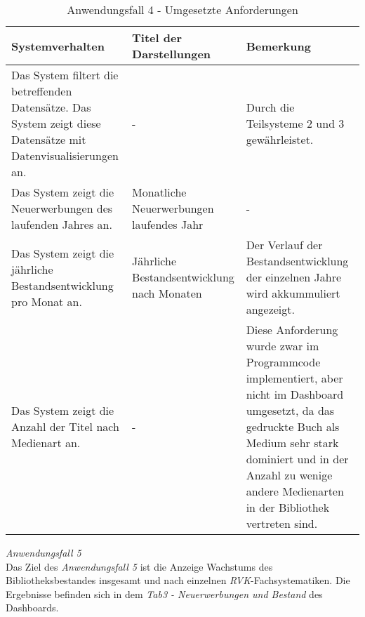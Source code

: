 \begingroup
    \setlength{\tabcolsep}{12pt} %
    \renewcommand{\arraystretch}{1.5} 
    \begin{table}[h]
        \centering
        \Large
        \begin{adjustbox}{max width=\textwidth}
        \begin{tabular}{p{}p{}p{}}
           \toprule
           Systemverhalten        &Titel der Darstellungen&Bemerkung\\
           \midrule
           Das System filtert die betreffenden Datensätze. Das System zeigt diese Datensätze mit Datenvisualisierungen an.&-&Durch die Teilsysteme 2  und 3 gewährleistet.\\
           Das System zeigt die Neuerwerbungen des laufenden Jahres an.&Monatliche Neuerwerbungen laufendes Jahr&-\\
           Das System zeigt die jährliche Bestandsentwicklung pro Monat an.&Jährliche Bestandsentwicklung nach Monaten&Der Verlauf der Bestandsentwicklung der einzelnen Jahre wird akkummuliert angezeigt.\\
           Das System zeigt die Anzahl der Titel nach Medienart an.&-&Diese Anforderung wurde zwar im Programmcode implementiert, aber nicht im Dashboard umgesetzt, da das gedruckte Buch als Medium sehr stark dominiert und in der Anzahl zu wenige andere Medienarten in der Bibliothek vertreten sind.\\

        \bottomrule
        \end{tabular}
        \end{adjustbox}
        \caption{%
            Anwendungsfall 4 - Umgesetzte Anforderungen
        }
        \label{tab:Anwendungsfall 4 - Umgesetzte Anforderungen}
        \end{table}
\endgroup

\clearpage
\noindent
\textit{Anwendungsfall 5}\\
Das Ziel des \textit{Anwendungsfall 5} ist die Anzeige Wachstums des Bibliotheksbestandes insgesamt und nach einzelnen \textit{\acrshort{RVK}}-Fachsystematiken.
Die Ergebnisse befinden sich in dem \textit{Tab3 - Neuerwerbungen und Bestand} des Dashboards.

